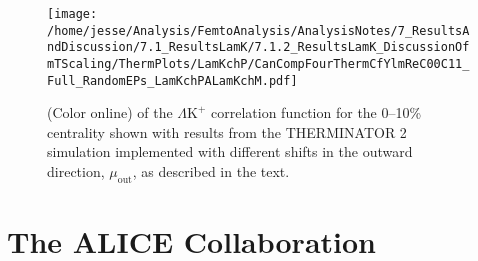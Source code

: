 \documentclass[ALICE,manyauthors]{cernphprep}
\newcommand{\LamKchP}{$\Lambda\mathrm{K^{+}}$\xspace}
\begin{document}
\begin{figure}[h]
  \centering
  \texttt{[image: /home/jesse/Analysis/FemtoAnalysis/AnalysisNotes/7\_ResultsAndDiscussion/7.1\_ResultsLamK/7.1.2\_ResultsLamK\_DiscussionOfmTScaling/ThermPlots/LamKchP/CanCompFourThermCfYlmReC00C11\_Full\_RandomEPs\_LamKchPALamKchM.pdf]}
  \caption[\LamKchP $C_{00}$ and $\Re C_{11}$ Spherical Harmonic Components (0--10\%) with THERMINATOR 2 ($b = 2$ fm]
  {
  (Color online) {} {} of the \LamKchP correlation function for the 0--10\% centrality {\color{red}{bin}} {\color{blue}{interval}} shown with results from the THERMINATOR 2 simulation implemented with different shifts in the outward direction, $\mu_{\mathrm{out}}$, as described in the text.
  }
  \label{fig:LamKchP_ThermSources_VaryMuOut_SH}
\end{figure}






\clearpage


\section{The ALICE Collaboration}
\label{app:collab}
\end{document}
